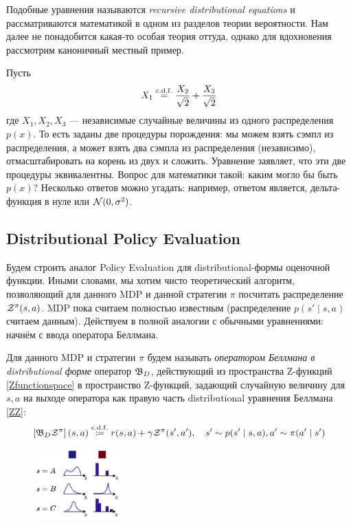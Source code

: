 Подобные уравнения называются \emph{recursive distributional equations} и рассматриваются математикой в одном из разделов теории вероятности. Нам далее не понадобится какая-то особая теория оттуда, однако для вдохновения рассмотрим каноничный местный пример. 
\begin{example}
Пусть
$$X_1 \mathrel{\stackrel{\mathrm{c.d.f.}}=} \frac{X_2}{\sqrt{2}} + \frac{X_3}{\sqrt{2}}$$
где $X_1, X_2, X_3$ --- независимые случайные величины из одного распределения $p(x)$. То есть заданы две процедуры порождения: мы можем взять сэмпл из распределения, а может взять два сэмпла из распределения (независимо), отмасштабировать на корень из двух и сложить. Уравнение заявляет, что эти две процедуры эквивалентны. Вопрос для математики такой: каким могло бы быть $p(x)$? Несколько ответов можно угадать: например, ответом является, дельта-функция в нуле или $\mathcal{N}(0, \sigma^2)$.
\end{example}

\subsection{Distributional Policy Evaluation}

Будем строить аналог Policy Evaluation для distributional-формы оценочной функции. Иными словами, мы хотим чисто теоретический алгоритм, позволяющий для данного MDP и данной стратегии $\pi$ посчитать распределение $\mathcal{Z}^\pi(s, a)$. MDP пока считаем полностью известным (распределение $p(s' \mid s, a)$ считаем данным). Действуем в полной аналогии с обычными уравнениями: начнём с ввода оператора Беллмана.

\begin{definition}
Для данного MDP и стратегии $\pi$ будем называть \emph{оператором Беллмана в distributional форме} оператор $\mathfrak{B}_D$, действующий из пространства Z-функций \eqref{Zfunctionspace} в пространство Z-функций, задающий случайную величину для $s, a$ на выходе оператора как правую часть distributional уравнения Беллмана \eqref{ZZ}:
$$\left[\mathfrak{B}_D \mathcal{Z}^\pi\right](s, a) \mathrel{\stackrel{\mathrm{c.d.f.}}\coloneqq} r(s, a) + \gamma \mathcal{Z}^\pi(s', a'), \quad s' \sim p(s' \mid s, a), a' \sim \pi(a' \mid s')$$
\end{definition}

\begin{figure}
\vspace{-0.5cm}
\centering
\includegraphics[width=0.3\textwidth]{Images/DistributionalTable.png}
\vspace{-0.9cm}
\end{figure}

